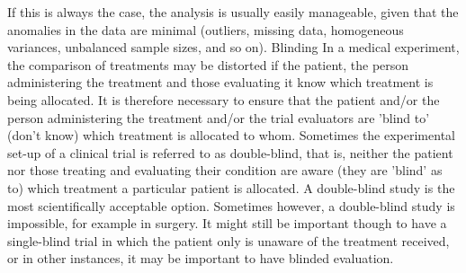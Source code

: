 If this is always the case, the analysis is usually easily manageable, given that the anomalies in the data are minimal (outliers, missing data, homogeneous variances, unbalanced sample sizes, and so on).
Blinding
In a medical experiment, the comparison of treatments may be distorted if the patient, the person administering the treatment and those evaluating it know which treatment is being allocated. It is therefore necessary to ensure that the patient and/or the person administering the treatment and/or the trial evaluators are 'blind to' (don't know) which treatment is allocated to whom.
Sometimes the experimental set-up of a clinical trial is referred to as double-blind, that is, neither the patient nor those treating and evaluating their condition are aware (they are 'blind' as to) which treatment a particular patient is allocated. A double-blind study is the most scientifically acceptable option.
Sometimes however, a double-blind study is impossible, for example in surgery. It might still be important though to have a single-blind trial in which the patient only is unaware of the treatment received, or in other instances, it may be important to have blinded evaluation.

